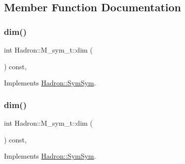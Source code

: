 \subsection{Member Function Documentation}
\mbox{\label{structHadron_1_1M__sym__t_a9ee8ba6fd6c2220231052690b2995ed5}} 
\subsubsection{\texorpdfstring{dim()}{dim()}\hspace{0.1cm}{\footnotesize\ttfamily [1/5]}}
{\footnotesize\ttfamily int Hadron\+::\+M\+\_\+sym\+\_\+t\+::dim (\begin{DoxyParamCaption}{ }\end{DoxyParamCaption}) const\hspace{0.3cm}{\ttfamily [inline]}, {\ttfamily [virtual]}}



Implements \mbox{\hyperlink{structHadron_1_1SymSym_ae57780f41b9f6c03c6056eed3677bd48}{Hadron\+::\+Sym\+Sym}}.

\mbox{\label{structHadron_1_1M__sym__t_a9ee8ba6fd6c2220231052690b2995ed5}} 
\subsubsection{\texorpdfstring{dim()}{dim()}\hspace{0.1cm}{\footnotesize\ttfamily [2/5]}}
{\footnotesize\ttfamily int Hadron\+::\+M\+\_\+sym\+\_\+t\+::dim (\begin{DoxyParamCaption}{ }\end{DoxyParamCaption}) const\hspace{0.3cm}{\ttfamily [inline]}, {\ttfamily [virtual]}}



Implements \mbox{\hyperlink{structHadron_1_1SymSym_ae57780f41b9f6c03c6056eed3677bd48}{Hadron\+::\+Sym\+Sym}}.

\mbox{\label{structHadron_1_1M__sym__t_a9ee8ba6fd6c2220231052690b2995ed5}} 
